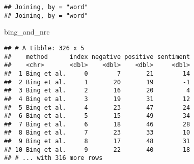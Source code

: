 \documentclass[]{article}
\newenvironment{Shaded}{\begin{snugshade}}{\end{snugshade}}
\newcommand{\KeywordTok}[1]{\textcolor[rgb]{0.13,0.29,0.53}{\textbf{#1}}}
\newcommand{\DataTypeTok}[1]{\textcolor[rgb]{0.13,0.29,0.53}{#1}}
\newcommand{\DecValTok}[1]{\textcolor[rgb]{0.00,0.00,0.81}{#1}}
\newcommand{\StringTok}[1]{\textcolor[rgb]{0.31,0.60,0.02}{#1}}
\newcommand{\OperatorTok}[1]{\textcolor[rgb]{0.81,0.36,0.00}{\textbf{#1}}}
\newcommand{\NormalTok}[1]{#1}
\begin{document}
\begin{Shaded}
\end{Shaded}

\begin{verbatim}
## Joining, by = "word"
## Joining, by = "word"
\end{verbatim}

\begin{Shaded}
\begin{Highlighting}[]
\NormalTok{bing_and_nrc}
\end{Highlighting}
\end{Shaded}

\begin{verbatim}
## # A tibble: 326 x 5
##    method      index negative positive sentiment
##    <chr>       <dbl>    <dbl>    <dbl>     <dbl>
##  1 Bing et al.     0        7       21        14
##  2 Bing et al.     1       20       19        -1
##  3 Bing et al.     2       16       20         4
##  4 Bing et al.     3       19       31        12
##  5 Bing et al.     4       23       47        24
##  6 Bing et al.     5       15       49        34
##  7 Bing et al.     6       18       46        28
##  8 Bing et al.     7       23       33        10
##  9 Bing et al.     8       17       48        31
## 10 Bing et al.     9       22       40        18
## # ... with 316 more rows
\end{verbatim}
\end{document}
